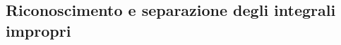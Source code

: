 \subsection{Riconoscimento e separazione degli integrali impropri}
\label{sec:esercizi-integrali-riconoscere-integrali-impropri}
